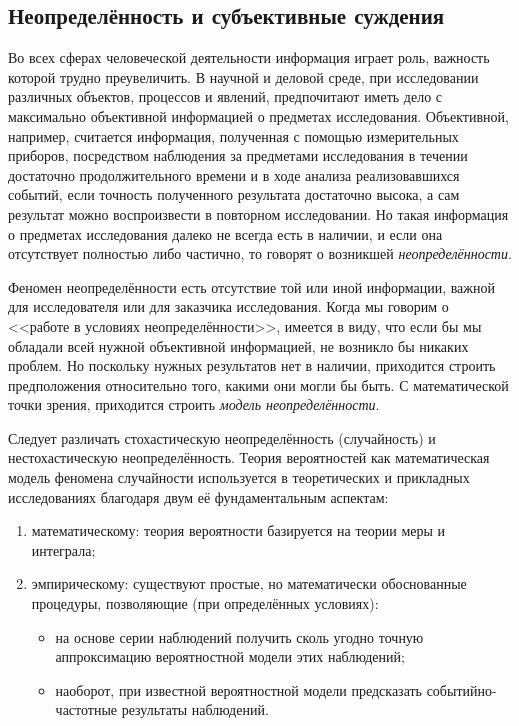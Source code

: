 
\subsection{Неопределённость и субъективные суждения}
\label{sec:intro_uncertainty}

Во всех сферах человеческой деятельности информация играет роль, важность которой трудно преувеличить. В научной и деловой среде, при исследовании различных объектов, процессов и явлений,  предпочитают иметь дело с максимально объективной информацией о предметах исследования. Объективной, например, считается информация, полученная с помощью измерительных приборов, посредством наблюдения за предметами исследования в течении достаточно продолжительного времени и в ходе анализа реализовавшихся событий, если точность полученного результата достаточно высока, а сам результат можно воспроизвести в повторном исследовании. Но такая информация о предметах исследования далеко не всегда есть в наличии, и если она отсутствует полностью либо частично, то говорят о возникшей {\sl неопределённости}. 

Феномен неопределённости есть отсутствие той или иной информации, важной для исследователя или для заказчика исследования. Когда мы говорим о <<работе в условиях неопределённости>>, имеется в виду, что если бы мы обладали всей нужной объективной информацией, не возникло бы никаких проблем. Но поскольку нужных результатов  нет в наличии, приходится строить предположения относительно того, какими они могли бы быть. С математической точки зрения, приходится строить {\sl модель неопределённости}. 

Следует различать стохастическую неопределённость (случайность) и нестохастическую неопределённость. Теория вероятностей как математическая модель феномена случайности используется в теоретических и прикладных исследованиях благодаря двум её фундаментальным аспектам:
\begin{enumerate}
  \item математическому: теория вероятности базируется на теории меры и интеграла;
  \item эмпирическому: существуют простые, но математически обоснованные процедуры, позволяющие (при определённых условиях):
  \begin{itemize}
  \item  на основе серии наблюдений получить сколь угодно точную аппроксимацию вероятностной модели этих наблюдений;
  \item наоборот, при известной вероятностной модели предсказать событийно-частотные результаты наблюдений. 
  \end{itemize} 
\end{enumerate}

